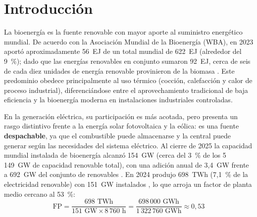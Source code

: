 \chapter*{Introducción}

La bioenergía es la fuente renovable con mayor aporte al suministro energético mundial. De acuerdo con la Asociación Mundial de la Bioenergía (WBA), en 2023 aportó aproximadamente 56~EJ de un total mundial de 622~EJ (alrededor del 9~\%); dado que las energías renovables en conjunto sumaron 92~EJ, cerca de seis de cada diez unidades de energía renovable provinieron de la biomasa \cite{wba2025gbsr}. Este predominio obedece principalmente al uso térmico (cocción, calefacción y calor de proceso industrial), diferenciándose entre el aprovechamiento tradicional de baja eficiencia y la bioenergía moderna en instalaciones industriales controladas.

En la generación eléctrica, su participación es más acotada, pero presenta un rasgo distintivo frente a la energía solar fotovoltaica y la eólica: es una fuente \textbf{despachable}, ya que el combustible puede almacenarse y la central puede generar según las necesidades del sistema eléctrico. Al cierre de 2025 la capacidad mundial instalada de bioenergía alcanzó 154~GW (cerca del 3~\% de los 5\,149~GW de capacidad renovable total), con una adición anual de 3,4~GW frente a 692~GW del conjunto de renovables \cite{irena2026capacity}. En 2024 produjo 698~TWh (7,1~\% de la electricidad renovable) con 151~GW instalados \cite{wba2025gbsr}, lo que arroja un factor de planta medio cercano al 53~\%:
\begin{equation*}
\mathrm{FP} = \frac{698\text{ TWh}}{151\text{ GW} \times 8\,760\text{ h}} = \frac{698\,000\text{ GWh}}{1\,322\,760\text{ GWh}} \approx 0{,}53
\end{equation*}


